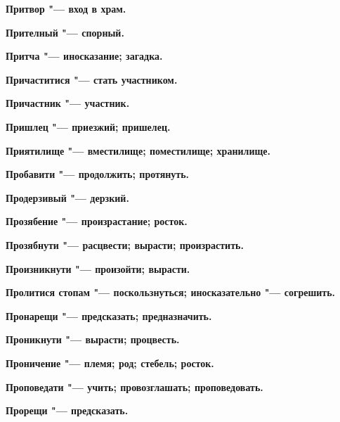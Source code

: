 \bfseries Притвор \normalfont{} "--- вход в храм. 




\bfseries Прителный \normalfont{} "--- спорный. 




\bfseries Притча \normalfont{} "--- иносказание; загадка. 




\bfseries Причаститися \normalfont{} "--- стать участником. 




\bfseries Причастник \normalfont{} "--- участник. 




\bfseries Пришлец \normalfont{} "--- приезжий; пришелец. 




\bfseries Приятилище \normalfont{} "--- вместилище; поместилище; хранилище. 




\bfseries Пробавити \normalfont{} "--- продолжить; протянуть. 




\bfseries Продерзивый \normalfont{} "--- дерзкий. 




\bfseries Прозябение \normalfont{} "--- произрастание; росток. 




\bfseries Прозябнути \normalfont{} "--- расцвести; вырасти; произрастить. 




\bfseries Произникнути \normalfont{} "--- произойти; вырасти. 




\bfseries Пролитися стопам \normalfont{} "--- поскользнуться; иносказательно "--- согрешить. 




\bfseries Пронарещи \normalfont{} "--- предсказать; предназначить. 




\bfseries Проникнути \normalfont{} "--- вырасти; процвесть. 




\bfseries Проничение \normalfont{} "--- племя; род; стебель; росток. 




\bfseries Проповедати \normalfont{} "--- учить; провозглашать; проповедовать. 




\bfseries Прорещи \normalfont{} "--- предсказать. 




